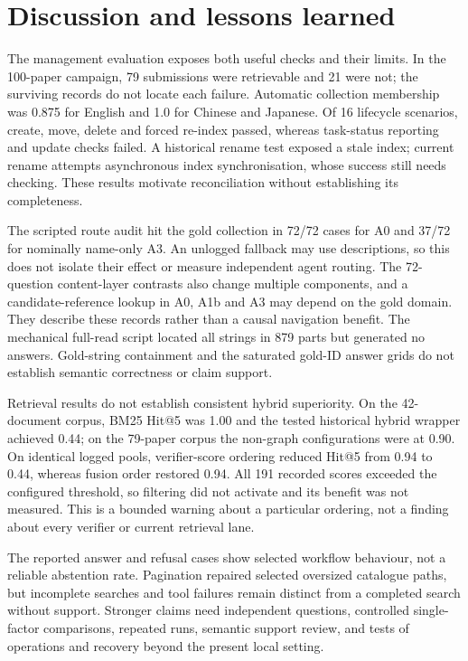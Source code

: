 \section{Discussion and lessons learned}
\label{sec:discussion}

The management evaluation exposes both useful checks and their limits. In the
100-paper campaign, 79 submissions were retrievable and 21 were not; the
surviving records do not locate each failure. Automatic collection membership
was 0.875 for English and 1.0 for Chinese and Japanese. Of 16 lifecycle
scenarios, create, move, delete and forced re-index passed, whereas task-status
reporting and update checks failed. A historical rename test exposed a stale
index; current rename attempts asynchronous index synchronisation, whose
success still needs checking. These results motivate reconciliation without
establishing its completeness.

The scripted route audit hit the gold collection in 72/72 cases for A0 and
37/72 for nominally name-only A3. An unlogged fallback may use descriptions,
so this does not isolate their effect or measure independent agent routing.
The 72-question content-layer contrasts also change multiple components, and a
candidate-reference lookup in A0, A1b and A3 may depend on the gold domain.
They describe these records rather than a causal navigation benefit. The
mechanical full-read script located all strings in 879 parts but generated no
answers. Gold-string containment and the saturated gold-ID answer grids do not
establish semantic correctness or claim support.

Retrieval results do not establish consistent hybrid superiority. On the
42-document corpus, BM25 Hit@5 was 1.00 and the tested historical hybrid
wrapper achieved 0.44; on the 79-paper corpus the non-graph configurations
were at 0.90. On identical logged pools, verifier-score ordering reduced Hit@5
from 0.94 to 0.44, whereas fusion order restored 0.94. All 191 recorded scores
exceeded the configured threshold, so filtering did not activate and its
benefit was not measured. This is a bounded warning about a particular
ordering, not a finding about every verifier or current retrieval lane.

The reported answer and refusal cases show selected workflow behaviour, not a
reliable abstention rate. Pagination repaired selected oversized catalogue
paths, but incomplete searches and tool failures remain distinct from a
completed search without support. Stronger claims need independent questions,
controlled single-factor comparisons, repeated runs, semantic support review,
and tests of operations and recovery beyond the present local setting.
